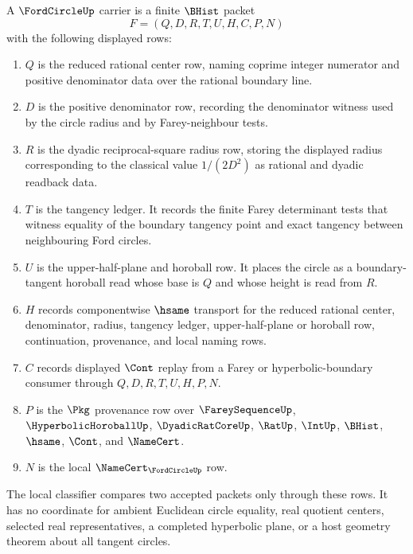 \begin{definition}\label{def:ford-circle-carrier}
A $\FordCircleUp$ carrier is a finite $\BHist$ packet
$$
F=(Q,D,R,T,U,H,C,P,N)
$$
with the following displayed rows:
\begin{enumerate}
\item $Q$ is the reduced rational center row, naming coprime integer numerator and positive denominator data over the rational boundary line.
\item $D$ is the positive denominator row, recording the denominator witness used by the circle radius and by Farey-neighbour tests.
\item $R$ is the dyadic reciprocal-square radius row, storing the displayed radius corresponding to the classical value $1/(2D^2)$ as rational and dyadic readback data.
\item $T$ is the tangency ledger. It records the finite Farey determinant tests that witness equality of the boundary tangency point and exact tangency between neighbouring Ford circles.
\item $U$ is the upper-half-plane and horoball row. It places the circle as a boundary-tangent horoball read whose base is $Q$ and whose height is read from $R$.
\item $H$ records componentwise $\hsame$ transport for the reduced rational center, denominator, radius, tangency ledger, upper-half-plane or horoball row, continuation, provenance, and local naming rows.
\item $C$ records displayed $\Cont$ replay from a Farey or hyperbolic-boundary consumer through $Q,D,R,T,U,H,P,N$.
\item $P$ is the $\Pkg$ provenance row over $\FareySequenceUp$, $\HyperbolicHoroballUp$, $\DyadicRatCoreUp$, $\RatUp$, $\IntUp$, $\BHist$, $\hsame$, $\Cont$, and $\NameCert$.
\item $N$ is the local $\NameCert_{\FordCircleUp}$ row.
\end{enumerate}
The local classifier compares two accepted packets only through these rows. It has no coordinate for ambient Euclidean circle equality, real quotient centers, selected real representatives, a completed hyperbolic plane, or a host geometry theorem about all tangent circles.
\end{definition}

